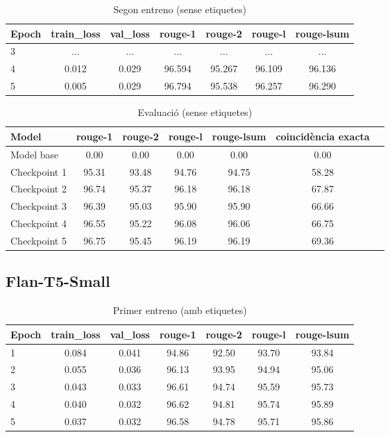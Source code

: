 \begin{table}[H]
    \caption{Segon entreno (sense etiquetes)}
    \begin{tabular}{lcccccc}
    \toprule
    Epoch & train\_loss & val\_loss & rouge-1 & rouge-2 & rouge-l & rouge-lsum \\
    \midrule
    3 & ...  & ...    & ...    & ...    & ...    & ... \\
    4 & 0.012 & 0.029 & 96.594 & 95.267 & 96.109 & 96.136 \\
    5 & 0.005 & 0.029 & 96.794 & 95.538 & 96.257 & 96.290 \\
    \bottomrule
    \end{tabular}
\end{table}

\begin{table}[H]
    \caption{Evaluació (sense etiquetes)}
    \begin{tabular}{lcccccc}
    \toprule
    Model & rouge-1 & rouge-2 & rouge-l & rouge-lsum & coincidència exacta \\
    \midrule
    Model base   & 0.00  & 0.00  & 0.00  & 0.00  & 0.00 \\
    Checkpoint 1 & 95.31 & 93.48 & 94.76 & 94.75 & 58.28 \\
    Checkpoint 2 & 96.74 & 95.37 & 96.18 & 96.18 & 67.87 \\
    Checkpoint 3 & 96.39 & 95.03 & 95.90 & 95.90 & 66.66 \\
    Checkpoint 4 & 96.55 & 95.22 & 96.08 & 96.06 & 66.75 \\
    Checkpoint 5 & 96.75 & 95.45 & 96.19 & 96.19 & 69.36 \\
    \bottomrule
    \end{tabular}
\end{table}






\subsection{Flan-T5-Small}
\begin{table}[H]
    \caption{Primer entreno (amb etiquetes)}
    \begin{tabular}{lcccccc}
    \toprule
    Epoch & train\_loss & val\_loss & rouge-1 & rouge-2 & rouge-l & rouge-lsum \\
    \midrule
    1 & 0.084 & 0.041 & 94.86 & 92.50 & 93.70 & 93.84 \\
    2 & 0.055 & 0.036 & 96.13 & 93.95 & 94.94 & 95.06 \\
    3 & 0.043 & 0.033 & 96.61 & 94.74 & 95.59 & 95.73 \\
    4 & 0.040 & 0.032 & 96.62 & 94.81 & 95.74 & 95.89 \\
    5 & 0.037 & 0.032 & 96.58 & 94.78 & 95.71 & 95.86 \\
    \bottomrule
    \end{tabular}
\end{table}

